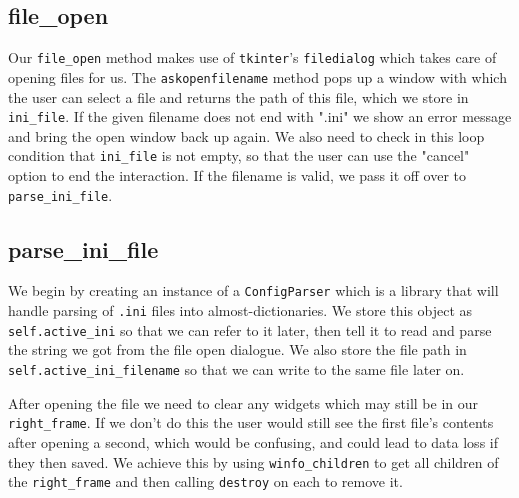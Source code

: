 \documentclass[a4paper,11pt,openany]{book}
\begin{document}
\subsection{file\_open}
Our \lstinline[columns=fixed]{file_open} method makes use of \lstinline[columns=fixed]{tkinter}'s \lstinline[columns=fixed]{filedialog} which takes care of opening files for us. The \lstinline[columns=fixed]{askopenfilename} method pops up a window with which the user can select a file and returns the path of this file, which we store in \lstinline[columns=fixed]{ini_file}. If the given filename does not end with ".ini" we show an error message and bring the open window back up again. We also need to check in this loop condition that \lstinline[columns=fixed]{ini_file} is not empty, so that the user can use the "cancel" option to end the interaction. If the filename is valid, we pass it off over to \lstinline[columns=fixed]{parse_ini_file}. 

\subsection{parse\_ini\_file}
We begin by creating an instance of a \lstinline[columns=fixed]{ConfigParser} which is a library that will handle parsing of \lstinline[columns=fixed]{.ini} files into almost-dictionaries. We store this object as \lstinline[columns=fixed]{self.active_ini} so that we can refer to it later, then tell it to read and parse the string we got from the file open dialogue. We also store the file path in \lstinline[columns=fixed]{self.active_ini_filename} so that we can write to the same file later on. 

\vspace{5mm}

After opening the file we need to clear any widgets which may still be in our \lstinline[columns=fixed]{right_frame}. If we don't do this the user would still see the first file's contents after opening a second, which would be confusing, and could lead to data loss if they then saved. We achieve this by using \lstinline[columns=fixed]{winfo_children} to get all children of the \lstinline[columns=fixed]{right_frame} and then calling \lstinline[columns=fixed]{destroy} on each to remove it.

\vspace{5mm}
\end{document}

